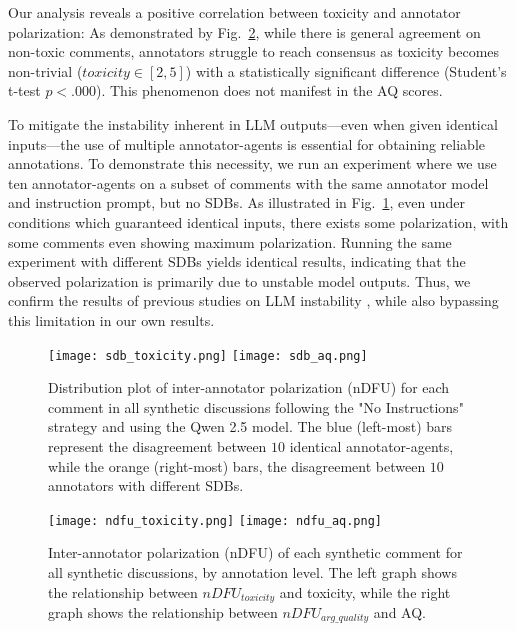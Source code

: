 Our analysis reveals a positive correlation between toxicity and annotator polarization: As demonstrated by Fig.~\ref{fig:ndfu_annot}, while there is general agreement on non-toxic comments, annotators struggle to reach consensus as toxicity becomes non-trivial ($\textit{toxicity} \in [2,5]$) with a statistically significant difference (Student's t-test $p < .000$). This phenomenon does not manifest in the \ac{AQ} scores. 

To mitigate the instability inherent in \ac{LLM} outputs—even when given identical inputs—the use of multiple annotator-agents is essential for obtaining reliable annotations. To demonstrate this necessity, we run an experiment where we use ten annotator-agents on a subset of comments with the same annotator model and instruction prompt, but no \acp{SDB}. As illustrated in Fig.~\ref{fig:sdb_annot}, even under conditions which guaranteed identical inputs, there exists some polarization, with some comments even showing maximum polarization. Running the same experiment with different \acp{SDB} yields identical results, indicating that the observed polarization is primarily due to unstable model outputs. Thus, we confirm the results of previous studies on \ac{LLM} instability \cite{rossi_2024, atil_2025}, while also bypassing this limitation in our own results.


\begin{figure}
    \texttt{[image: sdb\_toxicity.png]} \hfill
    \texttt{[image: sdb\_aq.png]}
	\centering
	\caption{Distribution plot of inter-annotator polarization (\ac{nDFU}) for each comment in all synthetic discussions following the "No Instructions" strategy and using the Qwen 2.5 model. The blue (left-most) bars represent the disagreement between $10$ identical annotator-agents, while the orange (right-most) bars, the disagreement between $10$ annotators with different \acp{SDB}.}
    \label{fig:sdb_annot}
\end{figure}

\begin{figure}
    \texttt{[image: ndfu\_toxicity.png]} \hfill
    \texttt{[image: ndfu\_aq.png]}
	\centering
	\caption{Inter-annotator polarization (\ac{nDFU}) of each synthetic comment for all synthetic discussions, by annotation level. The left graph shows the relationship between $nDFU_{toxicity}$ and toxicity, while the right graph shows the relationship between $nDFU_{arg\_quality}$ and \ac{AQ}.}
    \label{fig:ndfu_annot}
\end{figure}


